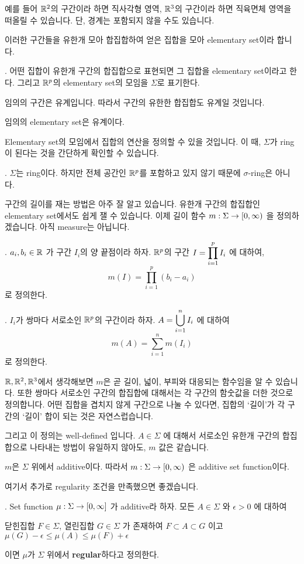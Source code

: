 예를 들어 \(\mathbb{R}^2\)의 구간이라 하면 직사각형 영역, \(\mathbb{R}^3\)의 구간이라 하면 직육면체 영역을 떠올릴 수 있습니다. 단, 경계는 포함되지 않을 수도 있습니다.

이러한 구간들을 유한개 모아 합집합하여 얻은 집합을 모아 elementary set이라 합니다.

.  어떤 집합이 유한개 구간의 합집합으로 표현되면 그 집합을 elementary set이라고 한다. 그리고 \(\mathbb{R}^p\)의 elementary set의 모임을 \(\Sigma\)로 표기한다.

임의의 구간은 유계입니다. 따라서 구간의 유한한 합집합도 유계일 것입니다.

\rmk 임의의 elementary set은 유계이다.

Elementary set의 모임에서 집합의 연산을 정의할 수 있을 것입니다. 이 때, \(\Sigma\)가 ring이 된다는 것을 간단하게 확인할 수 있습니다.

\prop. \(\Sigma\)는 ring이다. 하지만 전체 공간인 \(\mathbb{R}^p\)를 포함하고 있지 않기 때문에 \(\sigma\)-ring은 아니다.

구간의 길이를 재는 방법은 아주 잘 알고 있습니다. 유한개 구간의 합집합인 elementary set에서도 쉽게 잴 수 있습니다. 이제 길이 함수 \(m: \Sigma \rightarrow [0, \infty)\) 을 정의하겠습니다. 아직 measure는 아닙니다.

. \(a_i, b_i \in \mathbb{R}\) 가 구간 \(I_i\)의 양 끝점이라 하자. \(\mathbb{R}^p\)의 구간 \(I = \displaystyle \prod_{i=1}^p I_i\) 에 대하여,
\[
    m(I) = \prod_{i=1}^p (b_i - a_i)
\]
로 정의한다.

. \(I_i\)가 쌍마다 서로소인 \(\mathbb{R}^p\)의 구간이라 하자. \(A = \displaystyle\bigcup_{i=1}^n I_i\) 에 대하여
\[
    m(A) = \sum_{i=1}^n m(I_i)
\]
로 정의한다.

\(\mathbb{R}, \mathbb{R}^2, \mathbb{R}^3\)에서 생각해보면 \(m\)은 곧 길이, 넓이, 부피와 대응되는 함수임을 알 수 있습니다. 또한 쌍마다 서로소인 구간의 합집합에 대해서는 각 구간의 함숫값을 더한 것으로 정의합니다. 어떤 집합을 겹치지 않게 구간으로 나눌 수 있다면, 집합의 `길이'가 각 구간의 `길이' 합이 되는 것은 자연스럽습니다.

그리고 이 정의는 well-defined 입니다. \(A \in \Sigma\) 에 대해서 서로소인 유한개 구간의 합집합으로 나타내는 방법이 유일하지 않아도, \(m\) 값은 같습니다.

\rmk \(m\)은 \(\Sigma\) 위에서 additive이다. 따라서 \(m : \Sigma \rightarrow [0, \infty)\) 은 additive set function이다.

여기서 추가로 regularity 조건을 만족했으면 좋겠습니다.

.  Set function \(\mu: \Sigma \rightarrow [0, \infty]\) 가 additive라 하자. 모든 \(A \in \Sigma\) 와 \(\epsilon > 0\) 에 대하여
\begin{center}
    닫힌집합 \(F \in \Sigma\), 열린집합 \(G \in \Sigma\) 가 존재하여 \(F \subset A \subset G\) 이고 \(\mu(G) - \epsilon \leq \mu(A) \leq \mu(F) + \epsilon\)
\end{center}
이면 \(\mu\)가 \(\Sigma\) 위에서 \textbf{regular}하다고 정의한다.

